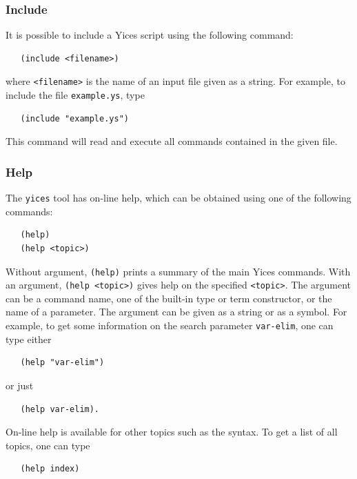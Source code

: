 \documentclass[11pt,twoside,fleqn,openright,titlepage]{cslreport}
\begin{document}
\subsubsection*{Include}

It is possible to include a Yices script using the following command:
\begin{small}
\begin{verbatim}
   (include <filename>)
\end{verbatim}
\end{small}
where \texttt{<filename>} is the name of an input file given as a
string. For example, to include the file \texttt{example.ys}, type
\begin{small}
\begin{verbatim}
   (include "example.ys")
\end{verbatim}
\end{small}
This command will read and execute all commands contained in the given
file.

\subsubsection*{Help}

The \texttt{yices} tool has on-line help, which can be obtained using one
of the following commands:
\begin{small}
\begin{verbatim}
   (help)
   (help <topic>)
\end{verbatim}
\end{small}
Without argument, \texttt{(help)} prints a summary of the main Yices
commands. With an argument, \texttt{(help <topic>)} gives help on the
specified \texttt{<topic>}. The argument can be a command name, one of
the built-in type or term constructor, or the name of a parameter.
The argument can be given as a string or as a symbol. For example, to
get some information on the search parameter \texttt{var-elim}, one
can type either
\begin{small}
\begin{verbatim}
   (help "var-elim")
\end{verbatim}
\end{small}
or just
\begin{small}
\begin{verbatim}
   (help var-elim).
\end{verbatim}
\end{small}
On-line help is available for other topics such as the syntax. To get a
list of all topics, one can type
\begin{small}
\begin{verbatim}
   (help index)
\end{verbatim}
\end{small}
\end{document}

